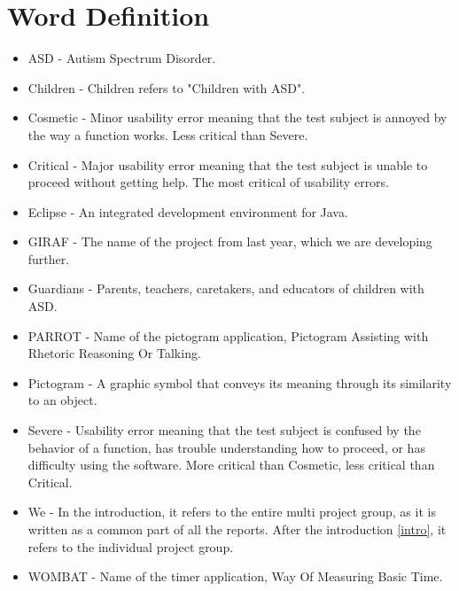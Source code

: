 \chapter*{Word Definition}

\begin{itemize}

	\item ASD - Autism Spectrum Disorder.
	
	\item Children - Children refers to "Children with ASD".
	\item Cosmetic - Minor usability error meaning that the test subject is annoyed by the way a function works. Less critical than Severe. 
	\item Critical - Major usability error meaning that the test subject is unable to proceed without getting help. The most critical of usability errors.
	\item Eclipse - An integrated development environment for Java.
	\item GIRAF - The name of the project from last year, which we are developing further.
	\item Guardians - Parents, teachers, caretakers, and educators of children with ASD.
	\item PARROT - Name of the pictogram application, Pictogram Assisting with Rhetoric Reasoning Or Talking.
	\item Pictogram - A graphic symbol that conveys its meaning through its similarity to an object.
	\item Severe - Usability error meaning that the test subject is confused by the behavior of a function, has trouble understanding how to proceed, or has difficulty using the software. More critical than Cosmetic, less critical than Critical.
	\item We - In the introduction, it refers to the entire multi project group, as it is written as a common part of all the reports. After the introduction \autoref{intro}, it refers to the individual project group.
	\item WOMBAT - Name of the timer application, Way Of Measuring Basic Time.

\end{itemize}